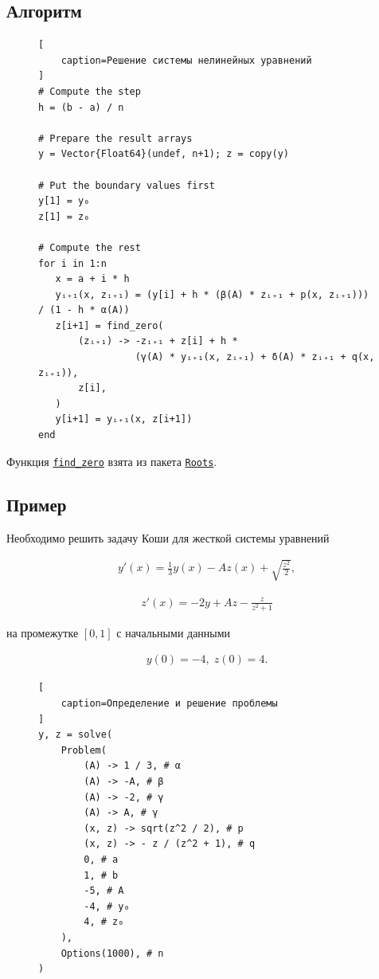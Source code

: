 \subsection{Алгоритм}

\begin{figure}[H]
\begin{lstlisting}[
    caption=Решение системы нелинейных уравнений
]
# Compute the step
h = (b - a) / n

# Prepare the result arrays
y = Vector{Float64}(undef, n+1); z = copy(y)

# Put the boundary values first
y[1] = y₀
z[1] = z₀

# Compute the rest
for i in 1:n
   x = a + i * h
   yᵢ₊₁(x, zᵢ₊₁) = (y[i] + h * (β(A) * zᵢ₊₁ + p(x, zᵢ₊₁))) / (1 - h * α(A))
   z[i+1] = find_zero(
       (zᵢ₊₁) -> -zᵢ₊₁ + z[i] + h *
                 (γ(A) * yᵢ₊₁(x, zᵢ₊₁) + δ(A) * zᵢ₊₁ + q(x, zᵢ₊₁)),
       z[i],
   )
   y[i+1] = yᵢ₊₁(x, z[i+1])
end
\end{lstlisting}
\end{figure}

Функция \href{https://juliahub.com/docs/Roots/o0Xsi/1.0.9/reference/#Roots.find_zero}{\footnotesize \texttt{find\_zero}} взята из пакета \href{https://github.com/JuliaMath/Roots.jl}{\footnotesize \texttt{Roots}}.

\subsection{Пример}

Необходимо решить задачу Коши для жесткой системы уравнений

\hs
\begin{gather}
     y'(x) = \frac{1}{3} y(x) - A z(x) + \sqrt{\frac{z^2}{2}},
\end{gather}

\begin{gather}
     z'(x) = -2 y + A z - \frac{z}{z^2 + 1}
\end{gather}

на промежутке $ [0, 1] $ с начальными данными

\hs
\begin{gather}
     y(0) = -4, \; z(0) = 4.
\end{gather}

\begin{figure}[H]
\begin{lstlisting}[
    caption=Определение и решение проблемы
]
y, z = solve(
    Problem(
        (A) -> 1 / 3, # α
        (A) -> -A, # β
        (A) -> -2, # γ
        (A) -> A, # γ
        (x, z) -> sqrt(z^2 / 2), # p
        (x, z) -> - z / (z^2 + 1), # q
        0, # a
        1, # b
        -5, # A
        -4, # y₀
        4, # z₀
    ),
    Options(1000), # n
)
\end{lstlisting}
\end{figure}

